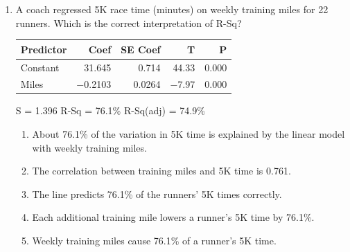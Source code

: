 \documentclass[12pt]{article}
\begin{document}
\begin{enumerate}[leftmargin=1.9em, itemsep=0.13in]
  \boxguard[12]
  \item \begin{minipage}[t]{0.42\linewidth}\raggedright
        A coach regressed 5K race time (minutes) on weekly training miles for 22 runners.
        Which is the correct interpretation of R-Sq?
        \end{minipage}\hfill
        \begin{minipage}[t]{0.56\linewidth}
        \centering\footnotesize\ttfamily
        \begin{tabular}[t]{@{} l r r r r @{}}
        Predictor & Coef & SE Coef & T & P \\ \hline
        Constant & 31.645 & 0.714 & 44.33 & 0.000 \\
        Miles & $-$0.2103 & 0.0264 & $-$7.97 & 0.000 \\
        \end{tabular}\par
        S = 1.396 \quad R-Sq = 76.1\% \quad R-Sq(adj) = 74.9\%\par
        \end{minipage}
        \begin{enumerate}[label=\textbf{(\Alph*)}, leftmargin=2.2em, itemsep=2pt]
          \item About 76.1\% of the variation in 5K time is explained by the linear model with
                weekly training miles.
          \item The correlation between training miles and 5K time is 0.761.
          \item The line predicts 76.1\% of the runners' 5K times correctly.
          \item Each additional training mile lowers a runner's 5K time by 76.1\%.
          \item Weekly training miles cause 76.1\% of a runner's 5K time.\hfill{}\rule[-0.2in]{0pt}{0.48in}
        \end{enumerate}


\end{enumerate}
\end{document}
